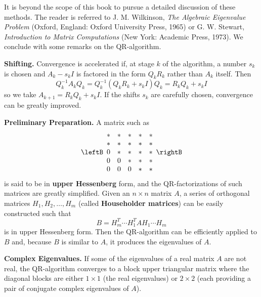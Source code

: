 It is beyond the scope of this book to 
pursue a detailed discussion of these methods. The reader is referred to
 J. M. Wilkinson, \textit{The Algebraic Eigenvalue Problem} (Oxford, England: Oxford University Press, 1965) or G. W. Stewart, \textit{Introduction to Matrix Computations} (New York: Academic Press, 1973). We conclude with some remarks on the QR-algorithm.

\smallskip
\noindent\textbf{Shifting.} Convergence is accelerated if, at stage $k$ of the algorithm, a number $s_{k}$ is chosen and $A_{k} - s_{k}I$ is factored in the form $Q_{k}R_{k}$ rather than $A_{k}$ itself. Then
\begin{equation*}
Q_{k}^{-1}A_{k}Q_{k} = Q_{k}^{-1}(Q_{k}R_{k} + s_{k}I)Q_{k} = R_{k}Q_{k} + s_{k}I
\end{equation*}
so we take $A_{k+1} = R_{k}Q_{k} + s_{k}I$. If the shifts $s_{k}$ are carefully chosen, convergence can be greatly improved.

\smallskip
\noindent\textbf{Preliminary Preparation.} A matrix such as
\begin{equation*}
\leftB \begin{array}{rrrrr}
\ast  & \ast & \ast & \ast & \ast  \\
\ast  & \ast & \ast & \ast & \ast  \\
0  & \ast & \ast & \ast & \ast  \\
0  & 0 & \ast & \ast & \ast  \\
0  & 0 & 0 & \ast & \ast  \\
\end{array}\rightB
\end{equation*}
is said to be in \textbf{upper Hessenberg} form, and the QR-factorizations of such matrices are greatly simplified. Given an $n \times n$ matrix $A$, a series of orthogonal matrices $H_{1}, H_{2}, \dots, H_{m}$ (called \textbf{Householder matrices}) can be easily constructed such that
\begin{equation*}
B = H_{m}^T \cdots H_{1}^TAH_{1} \cdots H_{m}
\end{equation*}
is in upper Hessenberg form. Then the QR-algorithm can be efficiently applied to $B$ and, because $B$ is similar to $A$, it produces the eigenvalues of $A$.

\smallskip
\noindent\textbf{Complex Eigenvalues.} If some of the eigenvalues of a real matrix $A$ are not real, the QR-algorithm converges to a block upper triangular matrix where the diagonal blocks are either $1 \times 1$ (the real eigenvalues) or $2 \times 2$ (each providing a pair of conjugate complex eigenvalues of $A$).
